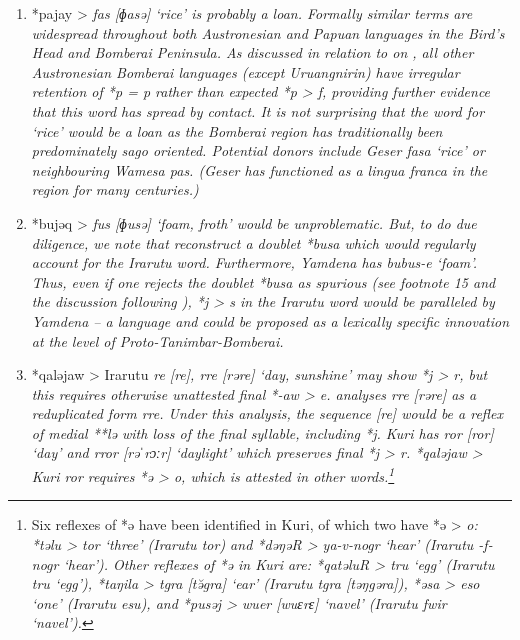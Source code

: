 \begin{enumerate}
	\item	*pajay > \it{fas} [ɸasə] ‘rice’ is probably a loan.
				Formally similar terms are widespread throughout both Austronesian
				and Papuan languages in the Bird’s Head and Bomberai Peninsula.
				As discussed in relation to  on ,
				all other Austronesian Bomberai languages (except Uruangnirin)
				have irregular retention of *p = \it{p} rather than expected
				*p > \it{f}, providing further evidence that this word has spread by contact.
				It is not surprising that the word for ‘rice’ would be a loan
				as the Bomberai region has traditionally been predominately sago oriented.
				Potential donors include Geser \it{fasa} ‘rice’ or neighbouring Wamesa \it{pas}.
				(Geser has functioned as a lingua franca in the region for many
				centuries.) \item	*bujəq > \it{fus} [ɸusə] ‘foam,
				froth’ would be unproblematic.
				But, to do due diligence,
				we note that \citet{BlustTrussel2020} reconstruct a doublet *busa
				which would regularly account for the Irarutu word.
				Furthermore, Yamdena has \it{bu{\tl}bus-e} ‘foam’.
				Thus, even if one rejects the doublet *busa as spurious (see
				footnote 15 and the discussion following ),
				*j > \it{s} in the Irarutu word would be paralleled by Yamdena -- a
				 language and could be proposed as a lexically specific innovation at the level of Proto-Tanimbar-Bomberai.
	\item	*qaləjaw > Irarutu \it{re} [re],
				\it{rre} [rəre] ‘day, sunshine’ may show *j > \it{r}, but this
				requires otherwise unattested final *-aw > \it{e}.
				\citet[262]{Jackson2014} analyses \it{rre} [rəre] as a reduplicated form \it{r{\tl}re}.
				Under this analysis, the sequence [re] would be a reflex of medial
				**lə with loss of the final syllable, including *j.
				Kuri has \it{ror} [ror] ‘day’
				and \it{rror} [rəˈrɔːr] ‘daylight’ which preserves final *j > \it{r}.
				*qaləjaw > Kuri \it{ror} requires *ə > \it{o},
				which is attested in other words.\footnote{
						Six reflexes of *ə
						have been identified in Kuri,
						of which two have *ə > \it{o}: *təlu > \it{tor} ‘three’ (Irarutu
						\it{tor}) and *dəŋəR > \it{ya-v-nogr} ‘hear’ (Irarutu \it{-f-nogr} ‘hear’).
						Other reflexes of *ə in Kuri are: *qatəluR > \it{tru} ‘egg’ (Irarutu
						\it{tru} ‘egg’), *taŋila > \it{tgra} [tə̆gra] ‘ear’ (Irarutu \it{tgra} [təŋgəra]),
						*əsa > \it{eso} ‘one’ (Irarutu \it{esu}),
						and *pusəj > \it{wuer} [wuɛrɛ] ‘navel’ (Irarutu \it{fwir} ‘navel’).}

\end{enumerate}
